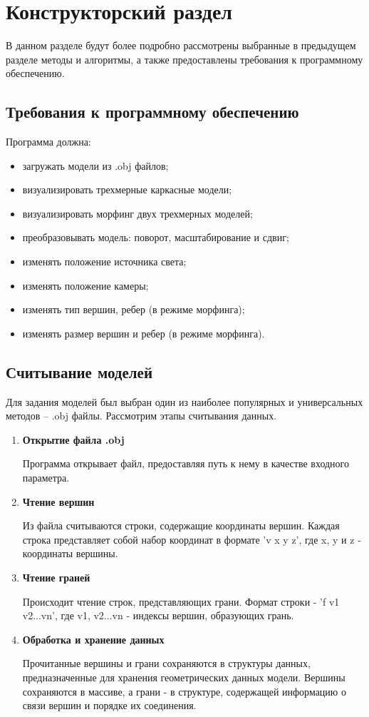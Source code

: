 \chapter{Конструкторский раздел}

В данном разделе будут более подробно рассмотрены выбранные в предыдущем разделе методы и алгоритмы, а также предоставлены требования к программному обеспечению.

\section{Требования к программному обеспечению}

Программа должна:
\begin{itemize}
	\item загружать модели из .obj файлов;
	\item визуализировать трехмерные каркасные модели;
	\item визуализировать морфинг двух трехмерных моделей;
	\item преобразовывать модель: поворот, масштабирование и сдвиг;
	\item изменять положение источника света;
	\item изменять положение камеры;
	\item изменять тип вершин, ребер (в режиме морфинга);
	\item изменять размер вершин и ребер (в режиме морфинга).
\end{itemize}


\section{Считывание моделей}

Для задания моделей был выбран один из наиболее популярных и универсальных методов – .obj файлы. 
Рассмотрим этапы считывания данных.
\begin{enumerate}
	\item \textbf{Открытие файла .obj}
	
	Программа открывает файл, предоставляя путь к нему в качестве входного параметра.
	
	\item \textbf{Чтение вершин}
	
	Из файла считываются строки, содержащие координаты вершин. 
	Каждая строка представляет собой набор координат в формате 'v x y z', где x, y и z - координаты вершины.
	
	\item \textbf{Чтение граней}
	
	Происходит чтение строк, представляющих грани. 
	Формат строки - 'f v1 v2...vn', где v1, v2...vn - индексы вершин, образующих грань.
	
	\item \textbf{Обработка и хранение данных}
	
	Прочитанные вершины и грани сохраняются в структуры данных, предназначенные для хранения геометрических данных 
	модели. 
	Вершины сохраняются в массиве, а грани - в структуре, содержащей информацию о связи вершин и порядке их соединения.
	
\end{enumerate}



